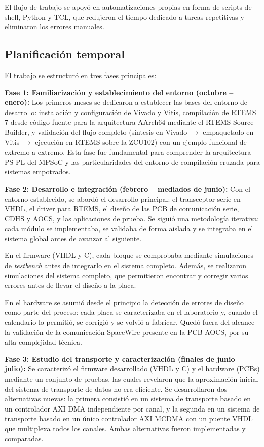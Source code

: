 El flujo de trabajo se apoyó en automatizaciones propias en forma de scripts de shell, Python y
TCL, que redujeron el tiempo dedicado a tareas repetitivas y eliminaron los errores manuales.

\subsection{Planificación temporal}

El trabajo se estructuró en tres fases principales:

\textbf{Fase 1: Familiarización y establecimiento del entorno (octubre -- enero):} Los primeros
meses se dedicaron a establecer las bases del entorno de desarrollo: instalación y
configuración de Vivado y Vitis, compilación de RTEMS 7 desde código fuente para la
arquitectura AArch64 mediante el RTEMS Source Builder, y validación del flujo completo
(síntesis en Vivado $\rightarrow$ empaquetado en Vitis $\rightarrow$ ejecución en RTEMS sobre la ZCU102) con
un ejemplo funcional de extremo a extremo. Esta fase fue fundamental para comprender la
arquitectura PS-PL del MPSoC y las particularidades del entorno de compilación cruzada
para sistemas empotrados.

\textbf{Fase 2: Desarrollo e integración (febrero -- mediados de junio):} Con el entorno establecido, se abordó
el desarrollo principal: el transceptor serie en VHDL, el driver para RTEMS, el diseño de las
PCB de comunicación serie, CDHS y AOCS, y las aplicaciones de prueba. Se siguió una metodología
iterativa: cada módulo se implementaba, se validaba de forma aislada y se integraba en el sistema
global antes de avanzar al siguiente.

En el firmware (VHDL y C), cada bloque se comprobaba mediante simulaciones de \textit{testbench}
antes de integrarlo en el sistema completo. Además, se realizaron simulaciones del sistema completo,
que permitieron encontrar y corregir varios errores antes de llevar el diseño a la placa.

En el hardware se asumió desde el principio la detección de errores de diseño como parte del
proceso: cada placa se caracterizaba en el laboratorio y, cuando el calendario lo permitió, se
corrigió y se volvió a fabricar. Quedó fuera del alcance la validación de la comunicación SpaceWire
presente en la PCB AOCS, por su alta complejidad técnica.

\textbf{Fase 3: Estudio del transporte y caracterización (finales de junio -- julio):} Se caracterizó el firmware desarrollado (VHDL y C) y el hardware (PCBs) mediante un conjunto de pruebas, las cuales
revelaron que la aproximación inicial del sistema de transporte de datos no era eficiente. Se desarrollaron
dos alternativas nuevas: la primera consistió en un sistema de transporte basado en un controlador AXI DMA independiente por canal,
y la segunda en un sistema de transporte basado en un único controlador AXI MCDMA con un puente VHDL que multiplexa 
todos los canales. Ambas alternativas fueron implementadas y comparadas.


